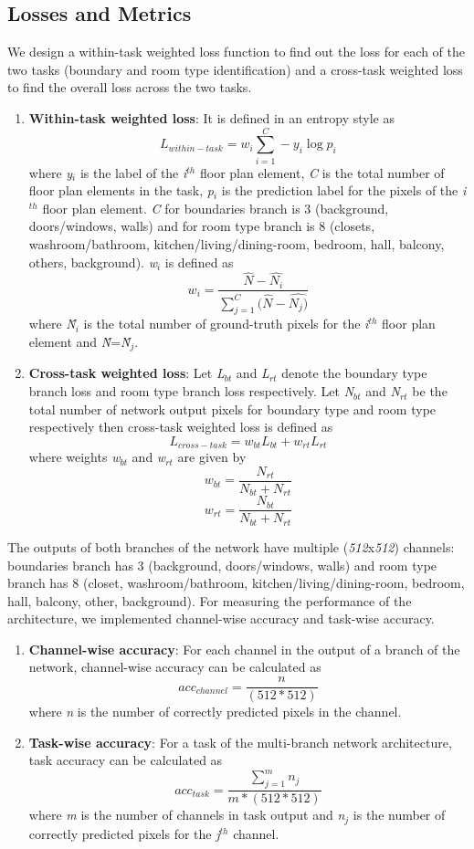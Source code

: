 \documentclass[a4paper]{article}
\begin{document}
\subsection{Losses and Metrics}
We design a within-task weighted loss function to find out the loss for each of the two tasks (boundary and room type identification) and a cross-task weighted loss to find the overall loss across the two tasks. 
\begin{enumerate}
    \item \textbf{Within-task weighted loss}: It is defined in an entropy style as
    \[
    L_{within-task} = w_{i}\sum_{i=1}^{C}-y_{i}\log{p_{i}}
    \]
    where \textit{y$_{i}$} is the label of the \textit{i$^{th}$} floor plan element, \textit{C} is the total number of floor plan elements in the task, \textit{p$_{i}$} is the prediction label for the pixels of the \textit{i$^{th}$} floor plan element. \textit{C} for boundaries branch is 3 (background, doors/windows, walls) and for room type branch is 8 (closets, washroom/bathroom, kitchen/living/dining-room, bedroom, hall, balcony, others, background). \textit{w$_{i}$} is defined as
    \[
    w_{i} = \frac{\hat{N} - \hat{N_{i}}} {\sum_{j=1}^{C}(\hat{N} - \hat{N_{j})}}
    \]
    where \textit{\^N$_{i}$} is the total number of ground-truth pixels for the \textit{i$^{th}$} floor plan element and \textit{\^N}=\textit{\^N$_{j}$}.
    \item \textbf{Cross-task weighted loss}: Let \textit{L$_{bt}$} and \textit{L$_{rt}$} denote the boundary type branch loss and room type branch loss respectively. Let \textit{N$_{bt}$} and \textit{N$_{rt}$} be the total number of network output pixels for boundary type and room type respectively then cross-task weighted loss is defined as
    \[
    L_{cross-task} = w_{bt}L_{bt} + w_{rt}L_{rt}
    \]
    where weights \textit{w$_{bt}$} and \textit{w$_{rt}$} are given by
    \[
    w_{bt} = \frac{N_{rt}}{N_{bt} + N_{rt}}    
    \]
    \[
    w_{rt} = \frac{N_{bt}}{N_{bt} + N_{rt}}
    \]
\end{enumerate}
The outputs of both branches of the network have multiple (\textit{512}x\textit{512}) channels: boundaries branch has 3 (background, doors/windows, walls) and room type branch has 8 (closet, washroom/bathroom, kitchen/living/dining-room, bedroom, hall, balcony, other, background). For measuring the performance of the architecture, we implemented channel-wise accuracy and task-wise accuracy. 
\begin{enumerate}
    \item \textbf{Channel-wise accuracy}: For each channel in the output of a branch of the network, channel-wise accuracy can be calculated as
    \[
    acc_{channel} = \frac{n}{(512 * 512)}
    \]
    where \textit{n} is the number of correctly predicted pixels in the channel.
    \item \textbf{Task-wise accuracy}: For a task of the multi-branch network architecture, task accuracy can be calculated as
    \[
    acc_{task} = \frac{\sum_{j=1}^{m}n_{j}}{m * (512 * 512)}
    \]
    where \textit{m} is the number of channels in task output and \textit{n$_{j}$} is the number of correctly predicted pixels for the \textit{j$^{th}$} channel.
\end{enumerate}
\end{document}
